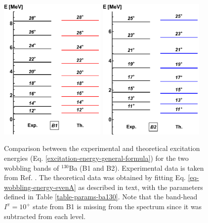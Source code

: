 \begin{figure}
    \centering
    \includegraphics[width=0.46\textwidth]{Chapters/Figures/ba130-band1.pdf}
    \includegraphics[width=0.46\textwidth]{Chapters/Figures/ba130-band2.pdf}
    \caption{Comparison between the experimental and theoretical excitation energies (Eq. \ref{excitation-energy-general-formula}) for the two wobbling bands of $^{130}$Ba (B1 and B2). Experimental data is taken from Ref. \cite{petrache2019diversity}. The theoretical data was obtained by fitting Eq. \ref{eq-wobbling-energy-evenA} as described in text, with the parameters defined in Table \ref{table-params-ba130}. Note that the band-head $I^\pi=10^+$ state from B1 is missing from the spectrum since it was subtracted from each level.}
    \label{plot-ba130-excitation-energies}
\end{figure}

